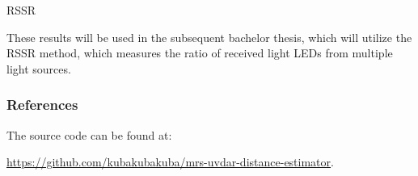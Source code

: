 \documentclass{beamer}
\begin{document}
	\begin{frame}{RSSR}

		These results will be used in the subsequent bachelor thesis, which will utilize the RSSR \cite{jung2014rssr}
		method, which measures the ratio of received light LEDs from multiple light sources.

		\begin{figure}
			\centering
			
			\hfill
			
		\end{figure}

	\end{frame}

	\begin{frame}[shrink=20]
		\frametitle{References}
		\begingroup
		\tiny
		\printbibliography[heading=none]
		\endgroup

		The source code can be found at:
		
		\url{https://github.com/kubakubakuba/mrs-uvdar-distance-estimator}.
	\end{frame}
\end{document}
